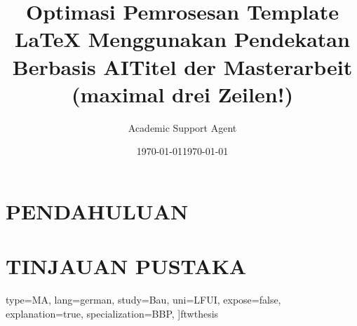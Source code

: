 \documentclass{ftwthesis}
\title{Optimasi Pemrosesan Template LaTeX Menggunakan Pendekatan Berbasis AI}
\author{Academic Support Agent}
\date{\today}
\begin{document}
\maketitle

\begin{abstract}

\end{abstract}

\chapter{PENDAHULUAN}


\chapter{TINJAUAN PUSTAKA}


  type=MA, %
  lang=german, %
  study=Bau, %
  uni=LFUI, %
  expose=false, %
  explanation=true, %
  specialization=BBP, %
]{ftwthesis}

\usepackage[T1]{fontenc}
\usepackage[utf8]{inputenc}

\usepackage[numbers]{natbib}

\AcademicTitlePre{} %

\title{Titel der Masterarbeit (maximal drei Zeilen!)}
\date{\today}

\end{document}
